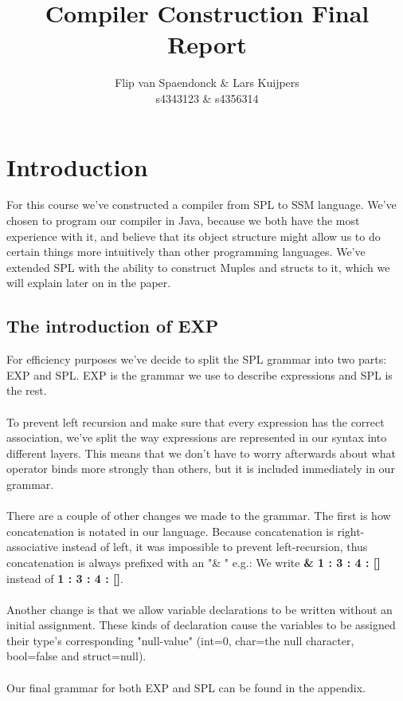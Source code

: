 \documentclass[10pt,a4paper]{article}
\author{Flip van Spaendonck \& Lars Kuijpers \\ s4343123 \& s4356314}
\title{Compiler Construction Final Report}
\begin{document}
\maketitle
\tableofcontents

\section{Introduction}
For this course we've constructed a compiler from SPL to SSM language. We've chosen to program our compiler in Java, because we both have the most experience with it, and believe that its object structure might allow us to do certain things more intuitively than other programming languages. We've extended SPL with the ability to construct Muples and structs to it, which we will explain later on in the paper.

\subsection{The introduction of EXP}
For efficiency purposes we've decide to split the SPL grammar into two parts: EXP and SPL. EXP is the grammar we use to describe expressions and SPL is the rest. \\
\\
To prevent left recursion and make sure that every expression has the correct association, we've split the way expressions are represented in our syntax into different layers. This means that we don't have to worry afterwards about what operator binds more strongly than others, but it is included immediately in our grammar.\\
\\
There are a couple of other changes we made to the grammar. The first is how concatenation is notated in our language. Because concatenation is right-associative instead of left, it was impossible to prevent left-recursion, thus concatenation is always prefixed with an "\& " e.g.: We write \textbf{\& 1 : 3 : 4 : []} instead of \textbf{1 : 3 : 4 : []}.\\
\\
Another change is that we allow variable declarations to be written without an initial assignment. These kinds of declaration cause the variables to be assigned their type's corresponding "null-value" (int=0, char=the null character, bool=false and struct=null).\\
\\
Our final grammar for both EXP and SPL can be found in the appendix.
\end{document}
